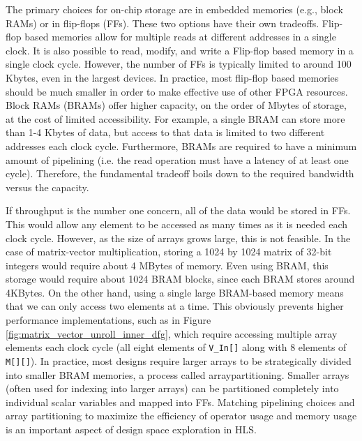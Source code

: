 The primary choices for on-chip storage are in embedded memories (e.g., block RAMs) or in flip-flops (FFs). These two options have their own tradeoffs. Flip-flop based memories allow for multiple reads at different addresses in a single clock.  It is also possible to read, modify, and write a Flip-flop based memory in a single clock cycle.  However, the number of FFs is typically limited to around 100 Kbytes, even in the largest devices. In practice, most flip-flop based memories should be much smaller in order to make effective use of other FPGA resources.  Block RAMs (BRAMs) offer higher capacity, on the order of Mbytes of storage, at the cost of limited accessibility. For example, a single BRAM can store more than 1-4 Kbytes of data, but access to that data is limited to two different addresses each clock cycle. Furthermore, BRAMs are required to have a minimum amount of pipelining (i.e. the read operation must have a latency of at least one cycle).  Therefore, the fundamental tradeoff boils down to the required bandwidth versus the capacity. 

If throughput is the number one concern, all of the data would be stored in FFs. This would allow any element to be accessed as many times as it is needed each clock cycle. However, as the size of arrays grows large, this is not feasible.  In the case of matrix-vector multiplication, storing a 1024 by 1024 matrix of 32-bit integers would require about 4 MBytes of memory.   Even using BRAM, this storage would require about 1024 BRAM blocks, since each BRAM stores around 4KBytes.  On the other hand, using a single large BRAM-based memory means that we can only access two elements at a time.  This obviously prevents higher performance implementations, such as in Figure \ref{fig:matrix_vector_unroll_inner_dfg}, which require accessing multiple array elements each clock cycle (all eight elements of \lstinline|V_In[]| along with 8 elements of \lstinline|M[][]|).  In practice, most designs require larger arrays to be strategically divided into smaller BRAM memories, a process called \gls{arraypartitioning}.  Smaller arrays (often used for indexing into larger arrays) can be partitioned completely into individual scalar variables and mapped into FFs.  Matching pipelining choices and array partitioning to maximize the efficiency of operator usage and memory usage is an important aspect of design space exploration in HLS.

